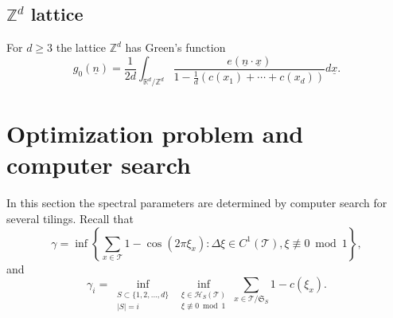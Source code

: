 \documentclass[a4paper, 12pt, notitlepage]{amsart}
\newcommand{\bR}{\mathbb{R}}
\newcommand{\zed}{\mathbb{Z}}
\newcommand{\sH}{\mathscr{H}}
\newcommand{\sT}{\mathscr{T}}
\newcommand{\un}{\underline{n}}
\newcommand{\ux}{\underline{x}}
\newcommand{\fS}{{\mathfrak{S}}}
\theoremstyle{remark}
\begin{document}
\subsection{$\zed^d$ lattice} For $d \geq 3$ the lattice $\zed^d$ has Green's function
\begin{equation}
 g_0(\un) = \frac{1}{2d} \int_{\bR^d/\zed^d} \frac{e(\un \cdot \ux)}{1- \frac{1}{d}\left(c(x_1)+\cdots+ c(x_d) \right)} d\ux.
\end{equation}




\section{Optimization problem and computer search}

In this section the spectral parameters are determined by computer search for several tilings. 
Recall that
\begin{equation*}
 \gamma = \inf \left\{ \sum_{x \in \sT} 1 - \cos(2\pi \xi_x):\Delta \xi \in C^1(\sT), \xi \not \equiv 0 \bmod 1\right\},
\end{equation*} and 
\begin{equation*}
 \gamma_i =  \inf_{\substack{S \subset \{1, 2, ..., d\}\\ |S| = i}} \inf_{\substack{\xi \in \sH_S(\sT)\\ \xi \not \equiv 0 \bmod 1}} \sum_{x \in \sT/\fS_S} 1- c( \xi_x).
\end{equation*}
\end{document}
